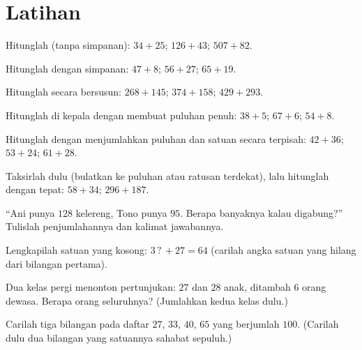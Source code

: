 \section{Latihan}

\begin{exercise}[$\star$]\label{exo:g2:addition:1}
Hitunglah (tanpa simpanan): $34 + 25$; \quad $126 + 43$; \quad
$507 + 82$.
\end{exercise}

\begin{exercise}[$\star$]\label{exo:g2:addition:2}
Hitunglah dengan simpanan: $47 + 8$; \quad $56 + 27$; \quad $65 + 19$.
\end{exercise}

\begin{exercise}[$\star$]\label{exo:g2:addition:3}
Hitunglah secara bersusun: $268 + 145$; \quad $374 + 158$; \quad
$429 + 293$.
\end{exercise}

\begin{exercise}[$\star$]\label{exo:g2:addition:4}
Hitunglah di kepala dengan membuat puluhan penuh: $38 + 5$; \quad
$67 + 6$; \quad $54 + 8$.
\end{exercise}

\begin{exercise}[$\star$]\label{exo:g2:addition:5}
Hitunglah dengan menjumlahkan puluhan dan satuan secara terpisah:
$42 + 36$; \quad $53 + 24$; \quad $61 + 28$.
\end{exercise}

\begin{exercise}[$\star$]\label{exo:g2:addition:6}
Taksirlah dulu (bulatkan ke puluhan atau ratusan terdekat), lalu
hitunglah dengan tepat: $58 + 34$; \quad $296 + 187$.
\end{exercise}

\begin{exercise}[$\star$]\label{exo:g2:addition:7}
``Ani punya $128$ kelereng, Tono punya $95$. Berapa banyaknya kalau
digabung?'' Tulislah penjumlahannya dan kalimat jawabannya.
\end{exercise}

\begin{exercise}[$\star$]\label{exo:g2:addition:8}
Lengkapilah satuan yang kosong: $3\,?\, + 27 = 64$ (carilah angka
satuan yang hilang dari bilangan pertama).
\end{exercise}

\begin{exercise}[$\star$]\label{exo:g2:addition:9}
Dua kelas pergi menonton pertunjukan: $27$ dan $28$ anak, ditambah
$6$ orang dewasa. Berapa orang seluruhnya? (Jumlahkan kedua kelas dulu.)
\end{exercise}

\begin{exercise}[$\star\star$]\label{exo:g2:addition:10}
Carilah tiga bilangan pada daftar $27$, $33$, $40$, $65$ yang
berjumlah $100$. (Carilah dulu dua bilangan yang satuannya sahabat sepuluh.)

\end{exercise}
